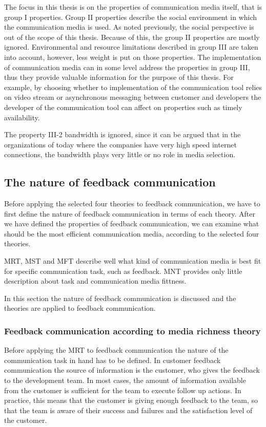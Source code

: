 \documentclass[english,12pt,a4paper,pdftex]{article}
\begin{document}
The focus in this thesis is on the properties of communication media itself, that is group I properties. Group II properties describe the social environment in which the communication media is used. As noted previously, the social perspective is out of the scope of this thesis. Because of this, the group II properties are mostly ignored. Environmental and resource limitations described in group III are taken into account, however, less weight is put on those properties. The implementation of communication media can in some level address the properties in group III, thus they provide valuable information for the purpose of this thesis. For example, by choosing whether to implementation of the communication tool relies on video stream or asynchronous messaging between customer and developers the developer of the communication tool can affect on properties such as timely availability.

The property III-2 bandwidth is ignored, since it can be argued that in the organizations of today where the companies have very high speed internet connections, the bandwidth plays very little or no role in media selection.

\subsection{The nature of feedback communication}

Before applying the selected four theories to feedback communication, we have to first define the nature of feedback communication in terms of each theory. After we have defined the properties of feedback communication, we can examine what should be the most efficient communication media, according to the selected four theories.

\Ac{MRT}, \ac{MST} and \ac{MFT} describe well what kind of communication media is best fit for specific communication task, such as feedback. \Ac{MNT} provides only little description about task and communication media fittness.

In this section the nature of feedback communication is discussed and the theories are applied to feedback communication.

\subsubsection{Feedback communication according to media richness theory}

Before applying the \ac{MRT} to feedback communication the nature of the communication task in hand has to be defined. In customer feedback communication the source of information is the customer, who gives the feedback to the development team. In most cases, the amount of information available from the customer is sufficient for the team to execute follow up actions. In practice, this means that the customer is giving enough feedback to the team, so that the team is aware of their success and failures and the satisfaction level of the customer.
\end{document}
